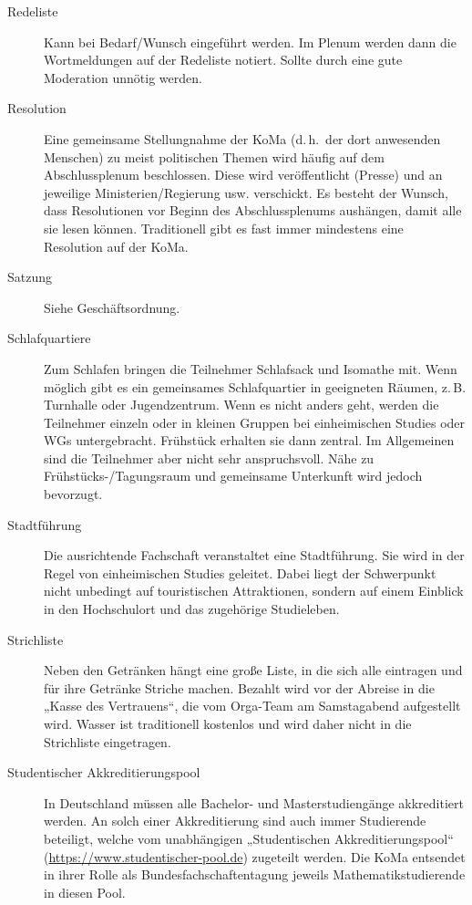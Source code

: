 \begin{description}
\item[Redeliste] Kann bei Bedarf/Wunsch eingeführt werden. Im Plenum werden
	dann die Wortmeldungen auf der Redeliste notiert. Sollte durch eine gute
	Moderation unnötig werden.

\item[Resolution] Eine gemeinsame Stellungnahme der KoMa (d.\,h.\ der dort
	anwesenden Menschen) zu meist politischen Themen wird häufig auf dem
	Abschlussplenum beschlossen.  Diese wird veröffentlicht (Presse) und an
	jeweilige Ministerien/Regierung usw. verschickt. Es besteht der Wunsch,
	dass Resolutionen vor Beginn des Abschlussplenums aushängen, damit alle sie
	lesen können. Traditionell gibt es fast immer mindestens eine Resolution
	auf der KoMa.

\item[Satzung] Siehe Geschäftsordnung.

\item[Schlafquartiere] Zum Schlafen bringen die Teilnehmer Schlafsack und
	Isomathe mit. Wenn möglich gibt es ein gemeinsames Schlafquartier in
	geeigneten Räumen, z.\,B. Turnhalle oder Jugendzentrum. Wenn es nicht
	anders geht, werden die Teilnehmer einzeln oder in kleinen Gruppen bei
	einheimischen Studies oder WGs untergebracht. Frühstück erhalten sie dann
	zentral. Im Allgemeinen sind die Teilnehmer aber nicht sehr anspruchsvoll.
	Nähe zu Frühstücks-/Tagungsraum und gemeinsame Unterkunft wird jedoch
	bevorzugt.

\item[Stadtführung] Die ausrichtende Fachschaft veranstaltet eine Stadtführung.
	Sie wird in der Regel von einheimischen Studies geleitet. Dabei liegt der
	Schwerpunkt nicht unbedingt auf touristischen Attraktionen, sondern auf
	einem Einblick in den Hochschulort und das zugehörige Studieleben.

\item[Strichliste] Neben den Getränken hängt eine große Liste, in die sich alle
	eintragen und für ihre Getränke Striche machen.  Bezahlt wird vor der
	Abreise in die „Kasse des Vertrauens“, die vom Orga-Team am Samstagabend
	aufgestellt wird.  Wasser ist traditionell kostenlos und wird daher nicht
	in die Strichliste eingetragen.

\item[Studentischer Akkreditierungspool]\label{itm:pool} In Deutschland müssen alle Bachelor-
	und Masterstudiengänge akkreditiert werden. An solch einer Akkreditierung
	sind auch immer Studierende beteiligt, welche vom unabhängigen
	„Studentischen Akkreditierungspool“
	(\url{https://www.studentischer-pool.de}) zugeteilt werden. Die KoMa
	entsendet in ihrer Rolle als Bundesfachschaftentagung jeweils
	Mathematikstudierende in diesen Pool.


\end{description}
